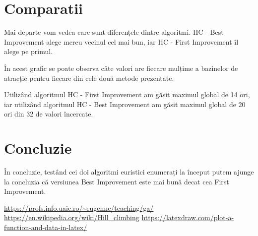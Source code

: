 \documentclass[12pt]{article}
\begin{document}
\section{Comparatii}
Mai departe vom vedea care sunt diferențele dintre algoritmi. HC - Best Improvement alege mereu vecinul cel mai bun, iar HC - First Improvement îl alege pe primul. 

În acest grafic se poate observa câte valori are fiecare mulțime a bazinelor de atracție pentru fiecare din cele două metode prezentate.



Utilizând algoritmul HC - First Improvement am găsit maximul global de 14 ori, iar utilizând algoritmul HC - Best Improvement am găsit maximul global de 20 ori din 32 de valori încercate.

\section{Concluzie}

În concluzie, testând cei doi algoritmi euristici enumerați la început putem ajunge la concluzia că versiunea Best Improvement este mai bună decat cea First Improvement. 

\begin{thebibliography}{9}
  \bibitem{}
    \url{https://profs.info.uaic.ro/~eugennc/teaching/ga/}
  \bibitem{}
    \url{https://en.wikipedia.org/wiki/Hill_climbing}
  \bibitem{}
    \url{https://latexdraw.com/plot-a-function-and-data-in-latex/}
  
  \end{thebibliography}  
  
\end{document}
